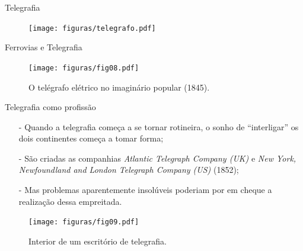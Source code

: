 \documentclass[aspectratio=169]{beamer}
\begin{document}
\begin{frame}{Telegrafia}
\begin{figure}
\texttt{[image: figuras/telegrafo.pdf]}
\end{figure}
\end{frame}

\begin{frame}{Ferrovias e Telegrafia}
\begin{figure}
	\texttt{[image: figuras/fig08.pdf]}
	\caption{O telégrafo elétrico no imaginário popular (1845).}
	\label{fig:08}
\end{figure}
\end{frame}

\begin{frame}{Telegrafia como profissão}
\begin{minipage}{0.47\textwidth}
	\begin{itemize}
		\item[-] Quando a telegrafia começa a se tornar rotineira, o sonho de ``interligar'' os dois continentes começa a tomar forma;
		\item[-] São criadas as companhias \emph{Atlantic Telegraph Company (UK)} e \emph{New York, Newfoundland and London Telegraph Company (US)} (1852);
		\item[-] Mas problemas aparentemente insolúveis poderiam por em cheque a realização dessa empreitada. 
	\end{itemize}
\end{minipage}
\begin{minipage}{0.5\textwidth}
\begin{figure}
	\texttt{[image: figuras/fig09.pdf]}
	\caption{Interior de um escritório de telegrafia.}
	\label{fig:09}
\end{figure}
\end{minipage}
\end{frame}
\end{document}
